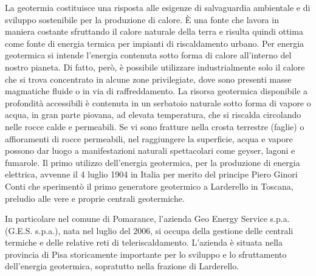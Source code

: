 \documentclass[laurea,oneside,11pt]{USiena_tesiLM}
\begin{document}
La geotermia costituisce una risposta alle esigenze di salvaguardia ambientale e di sviluppo sostenibile per la produzione di calore. È una fonte che lavora in maniera costante sfruttando il calore naturale della terra e risulta quindi ottima come fonte di energia termica per impianti di riscaldamento urbano.
Per energia geotermica si intende l'energia contenuta sotto forma di calore all'interno del nostro pianeta. Di fatto, però, è possibile utilizzare industrialmente solo il calore che si trova concentrato in alcune zone privilegiate, dove sono presenti masse magmatiche fluide o in via di raffreddamento. La risorsa geotermica disponibile a profondità accessibili è contenuta in un serbatoio naturale sotto forma di vapore o acqua, in gran parte piovana, ad elevata temperatura, che si riscalda circolando nelle rocce calde e permeabili. Se vi sono fratture nella crosta terrestre (faglie) o affioramenti di rocce permeabili, nel raggiungere la superficie, acqua e vapore possono dar luogo a manifestazioni naturali spettacolari come geyser, lagoni e fumarole.
Il primo utilizzo dell'energia geotermica, per la produzione di energia elettrica, avvenne il 4 luglio 1904 in Italia per merito del principe Piero Ginori Conti che sperimentò il primo generatore geotermico a Larderello in Toscana, preludio alle vere e proprie centrali geotermiche.
  
In particolare nel comune di Pomarance, l'azienda Geo Energy Service s.p.a. (G.E.S. s.p.a.), nata nel luglio del 2006, si occupa della gestione delle centrali termiche e delle relative reti di teleriscaldamento. L'azienda è situata nella provincia di Pisa storicamente importante per lo sviluppo e lo sfruttamento dell'energia geotermica, sopratutto nella frazione di Larderello.
\end{document}
